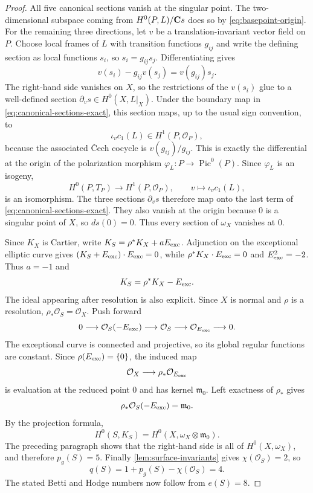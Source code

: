 \begin{proof}
All five canonical sections vanish at the singular point.
The two-dimensional subspace coming from $H^0(P,L)/\mathbf C s$ does so by
\eqref{eq:basepoint-origin}.  For the remaining three directions, let $v$ be a translation-invariant
vector field on $P$.  Choose local frames of $L$ with transition functions
$g_{ij}$ and write the defining section as local functions $s_i$, so
$s_i=g_{ij}s_j$.  Differentiating gives
\[
 v(s_i)-g_{ij}v(s_j)=v(g_{ij})s_j.
\]
The right-hand side vanishes on $X$, so the restrictions of the $v(s_i)$
glue to a well-defined section
$\partial_v s\in H^0(X,L|_X)$.  Under the boundary map in
\eqref{eq:canonical-sections-exact}, this section maps, up to the usual sign
convention, to
\[
 \iota_v c_1(L)\in H^1(P,\mathcal O_P),
\]
because the associated \v{C}ech cocycle is $v(g_{ij})/g_{ij}$.  This is
exactly the differential at the origin of the polarization morphism
$\varphi_L:P\to\operatorname{Pic}^0(P)$.  Since $\varphi_L$ is an isogeny,
\[
 H^0(P,T_P)\longrightarrow H^1(P,\mathcal O_P),
 \qquad v\longmapsto\iota_vc_1(L),
\]
is an isomorphism.  The three sections $\partial_v s$ therefore map onto the
last term of \eqref{eq:canonical-sections-exact}.  They also vanish at the
origin because $0$ is a singular point of $X$, so $ds(0)=0$.  Thus every
section of $\omega_X$ vanishes at $0$.

Since $K_X$ is Cartier, write
$K_S=\rho^*K_X+aE_{\mathrm{exc}}$.  Adjunction on the exceptional elliptic curve gives
$(K_S+E_{\mathrm{exc}})\cdot E_{\mathrm{exc}}=0$, while
$\rho^*K_X\cdot E_{\mathrm{exc}}=0$ and $E_{\mathrm{exc}}^2=-2$.  Thus $a=-1$ and
\begin{equation}
 K_S=\rho^*K_X-E_{\mathrm{exc}}.
\label{eq:canonical-resolution}
\end{equation}
The ideal appearing after resolution is also explicit.  Since
$X$ is normal and $\rho$ is a resolution,
$\rho_*\mathcal O_S=\mathcal O_X$.  Push forward
\[
 0\longrightarrow\mathcal O_S(-E_{\mathrm{exc}})\longrightarrow\mathcal O_S
 \longrightarrow\mathcal O_{E_{\mathrm{exc}}}\longrightarrow0.
\]
The exceptional curve is connected and projective, so its global regular
functions are constant.  Since $\rho(E_{\mathrm{exc}})=\{0\}$, the induced map
\[
 \mathcal O_X\longrightarrow\rho_*\mathcal O_{E_{\mathrm{exc}}}
\]
is evaluation at the reduced point $0$ and has kernel $\mathfrak m_0$.
Left exactness of $\rho_*$ gives
\[
 \rho_*\mathcal O_S(-E_{\mathrm{exc}})=\mathfrak m_0.
\]
By the projection formula,
\[
 H^0(S,K_S)=H^0(X,\omega_X\otimes\mathfrak m_0).
\]
The preceding paragraph shows that the right-hand side is all of
$H^0(X,\omega_X)$, and therefore $p_g(S)=5$.  Finally
\cref{lem:surface-invariants} gives $\chi(\mathcal O_S)=2$, so
\[
 q(S)=1+p_g(S)-\chi(\mathcal O_S)=4.
\]
The stated Betti and Hodge numbers now follow from $e(S)=8$.
\end{proof}

